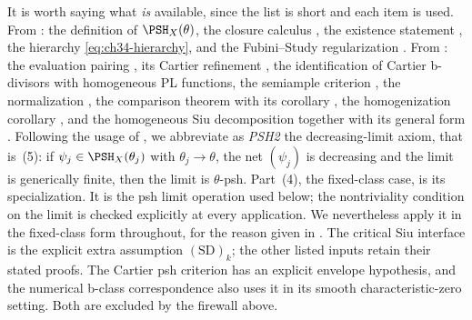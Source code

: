 It is worth saying what \emph{is} available, since the list is short and
each item is used.  From : the definition
 of $\PSH_X(\theta)$, the closure calculus
, the existence statement
, the hierarchy \eqref{eq:ch34-hierarchy}, and
the Fubini--Study regularization .  From
: the evaluation pairing
, its Cartier refinement
, the identification
 of Cartier b-divisors with homogeneous
PL functions, the semiample criterion
, the normalization
, the comparison theorem
 with its corollary
, the homogenization corollary
, and the homogeneous Siu decomposition
 together with its general form
.  Following the usage of
, we
abbreviate as \emph{PSH2} the decreasing-limit axiom, that is
\,(5): if $\psi_j\in\PSH_X(\theta_j)$ with
$\theta_j\to\theta$, the net $(\psi_j)$ is decreasing and the limit is
generically finite, then the limit is $\theta$-psh.  Part~(4), the
fixed-class case, is its specialization.  It is the psh limit operation
used below; the nontriviality condition on the limit is
checked explicitly at every application.  We nevertheless apply it in the
fixed-class form throughout, for the reason given in
.  The critical Siu interface is the explicit extra assumption
$\mathrm{(SD)}_k$; the other listed inputs retain their stated proofs.
The Cartier psh criterion has an explicit envelope hypothesis, and the
numerical b-class correspondence also uses it in its smooth
characteristic-zero setting. Both are excluded by the firewall above.

